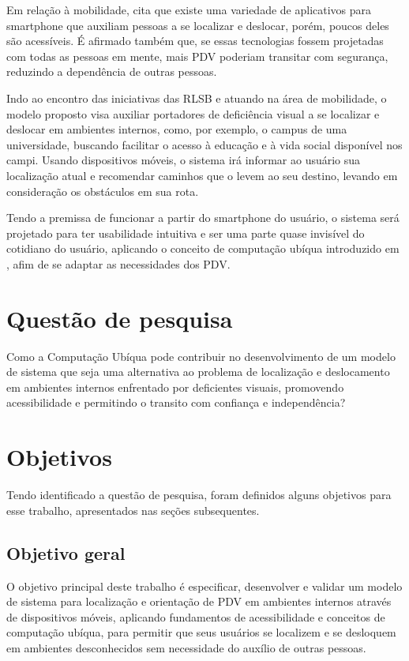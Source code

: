 \documentclass[english,brazilian]{UNISINOSmonografia}
\begin{document}
Em relação à mobilidade,  cita que existe uma variedade de aplicativos para smartphone que auxiliam pessoas a se localizar e deslocar, porém, poucos deles são acessíveis. É afirmado também que, se essas tecnologias fossem projetadas com todas as pessoas em mente, mais PDV poderiam transitar com segurança, reduzindo a dependência de outras pessoas. 

Indo ao encontro das iniciativas das RLSB e atuando na área de mobilidade, o modelo proposto visa auxiliar portadores de deficiência visual a se localizar e deslocar em ambientes internos, como, por exemplo, o campus de uma universidade, buscando facilitar o acesso à educação e à vida social disponível nos campi. Usando dispositivos móveis, o sistema irá informar ao usuário sua localização atual e recomendar caminhos que o levem ao seu destino, levando em consideração os obstáculos em sua rota.

Tendo a premissa de funcionar a partir do smartphone do usuário, o sistema será projetado para ter usabilidade intuitiva e ser uma parte quase invisível do cotidiano do usuário, aplicando o conceito de computação ubíqua introduzido em , afim de se adaptar as necessidades dos PDV.

	\section{Questão de pesquisa}
	Como a Computação Ubíqua pode contribuir no desenvolvimento de um modelo de sistema que seja uma alternativa ao problema de localização e deslocamento em ambientes internos enfrentado por deficientes visuais, promovendo acessibilidade e permitindo o transito com confiança e independência?

	\section{Objetivos}
	Tendo identificado a questão de pesquisa, foram definidos alguns objetivos para esse trabalho, apresentados nas seções subsequentes.
	
		\subsection{Objetivo geral}
		O objetivo principal deste trabalho é especificar, desenvolver e validar um modelo de sistema para localização e orientação de PDV em ambientes internos através de dispositivos móveis, aplicando fundamentos de acessibilidade e conceitos de computação ubíqua, para permitir que seus usuários se localizem e se desloquem em ambientes desconhecidos sem necessidade do auxílio de outras pessoas.
\end{document}
